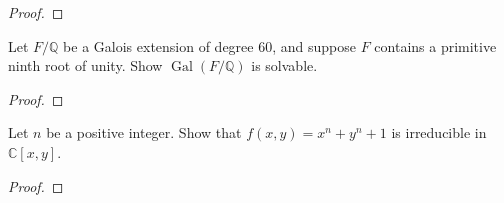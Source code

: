 \documentclass{article}
\newenvironment{problem}[2][Problem]{\begin{trivlist}
\item[\hskip \labelsep {\bfseries #1}\hskip \labelsep {\bfseries #2.}]}{\end{trivlist}}
\newcommand{\C}{\mathbb C}
\newcommand{\Q}{\mathbb Q}
\newcommand{\Gal}{\operatorname{Gal}}
\begin{document}
\begin{proof}
\end{proof}
\pagebreak

\begin{problem}{6}
  Let $F/\Q$ be a Galois extension of degree $60$, and suppose $F$ contains a primitive ninth root of unity. Show $\Gal(F/\Q)$ is solvable.
\end{problem}

\begin{proof}
\end{proof}
\pagebreak

\begin{problem}{7}
  Let $n$ be a positive integer. Show that $f(x,y) = x^n + y^n + 1$ is irreducible in $\C[x,y]$.
\end{problem}

\begin{proof}
\end{proof}
\end{document}
